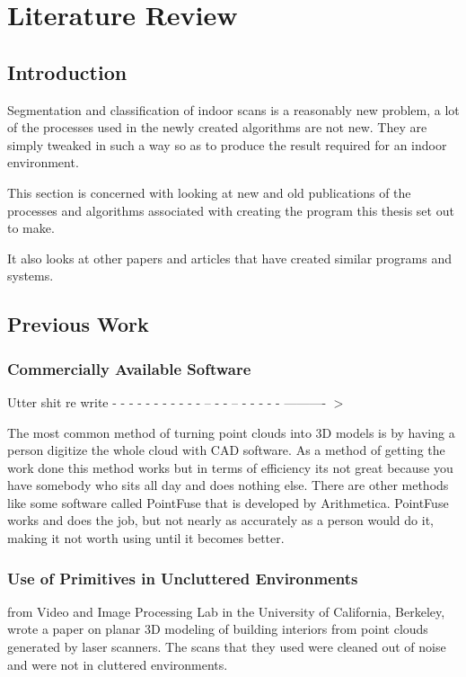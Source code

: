 \chapter{Literature Review}

\section{Introduction}
	Segmentation and classification of indoor scans is a reasonably new problem, a lot of the processes used in the newly created algorithms are not new. They are simply tweaked in such a way so as to produce the result required for an indoor environment. 
	
	This section is concerned with looking at new and old publications of the processes and algorithms associated with creating the program this thesis set out to make.
	
	It also looks at other papers and articles that have created similar programs and systems.
	
\section{Previous Work}

	\subsection{Commercially Available Software}
		Utter shit re write - - - - - -  - - - - - --  - - -- - - - - - ---------- $>$
	
		The most common method of turning point clouds into 3D models is by having a person digitize the whole cloud with CAD software. As a method of getting the work done this method works but in terms of efficiency its not great because you have somebody who sits all day and does nothing else. There are other methods like some software called PointFuse that is developed by Arithmetica. PointFuse works and does the job, but not nearly as accurately as a person would do it, making it not worth using until it becomes better.\\

	\subsection{Use of Primitives in Uncluttered Environments}
		\cite{sanchez_planar_2012} from Video and Image Processing Lab in the University of California, Berkeley, wrote a paper on planar 3D modeling of building interiors from point clouds generated by laser scanners. The scans that they used were cleaned out of noise and were not in cluttered environments.
		
